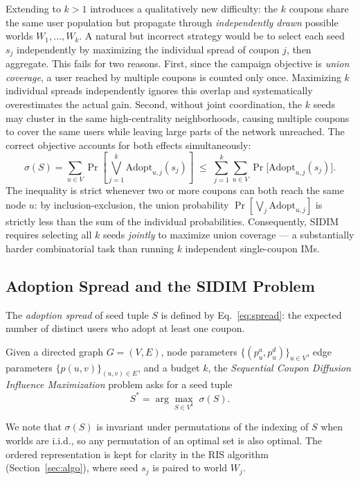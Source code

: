 \documentclass[sigconf]{acmart}
\begin{document}
Extending to $k > 1$ introduces a qualitatively new difficulty: the
$k$ coupons share the same user population but propagate through
\emph{independently drawn} possible worlds $W_1, \ldots, W_k$.
A natural but incorrect strategy would be to select each seed $s_j$
independently by maximizing the individual spread of coupon $j$, then
aggregate.
This fails for two reasons.
First, since the campaign objective is \emph{union coverage}, a user
reached by multiple coupons is counted only once.
Maximizing $k$ individual spreads independently ignores this overlap
and systematically overestimates the actual gain.
Second, without joint coordination, the $k$ seeds may cluster in the
same high-centrality neighborhoods, causing multiple coupons to cover
the same users while leaving large parts of the network unreached.
The correct objective accounts for both effects simultaneously:
\begin{equation}
  \label{eq:spread}
  \sigma(S)
  = \sum_{u \in V} \Pr\!\left[\bigvee_{j=1}^{k} \mathrm{Adopt}_{u,j}(s_j)\right]
  \;\leq\;
  \sum_{j=1}^{k} \sum_{u \in V} \Pr\bigl[\mathrm{Adopt}_{u,j}(s_j)\bigr].
\end{equation}
The inequality is strict whenever two or more coupons can both reach the
same node $u$: by inclusion-exclusion, the union probability
$\Pr[\bigvee_j \mathrm{Adopt}_{u,j}]$ is strictly less than the sum of
the individual probabilities.
Consequently, SIDIM requires selecting all $k$ seeds \emph{jointly} to
maximize union coverage — a substantially harder combinatorial task than
running $k$ independent single-coupon IMs.

\subsection{Adoption Spread and the SIDIM Problem}

The \emph{adoption spread} of seed tuple $S$ is defined by
Eq.~\eqref{eq:spread}: the expected number of distinct users who adopt
at least one coupon.

\begin{definition}[SIDIM]
\label{def:sidim}
Given a directed graph $G = (V, E)$, node parameters
$\{(p_u^a, p_u^d)\}_{u\in V}$, edge parameters $\{p(u,v)\}_{(u,v)\in E}$,
and a budget $k$, the \emph{Sequential Coupon Diffusion Influence
Maximization} problem asks for a seed tuple
\[
  S^* = \arg\max_{S \in V^k}\; \sigma(S).
\]
\end{definition}

We note that $\sigma(S)$ is invariant under permutations of the
indexing of $S$ when worlds are i.i.d., so any permutation of an
optimal set is also optimal.
The ordered representation is kept for clarity in the RIS algorithm
(Section~\ref{sec:algo}), where seed $s_j$ is paired to world $W_j$.
\end{document}
